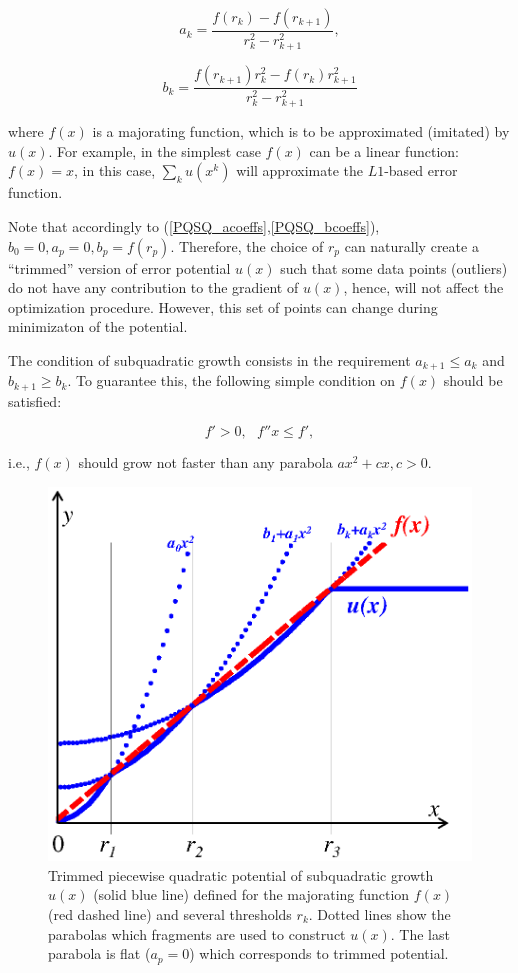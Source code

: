 \documentclass[preprint,12pt,twocolumn]{elsarticle}
\begin{document}
\begin{equation}\label{PQSQ_acoeffs}
a_k = \frac{f(r_k)-f(r_{k+1})}{r_k^2-r_{k+1}^2},
\end{equation}

\begin{equation}\label{PQSQ_bcoeffs}
b_k = \frac{f(r_{k+1})r_k^2-f(r_{k})r_{k+1}^2}{r_k^2-r_{k+1}^2}
\end{equation}

\noindent where $f(x)$ is a majorating function, which is to be approximated (imitated) by $u(x)$. For example, in the simplest case $f(x)$ can be a linear function: $f(x)=x$, in this case, $\sum_k u(x^k)$ will approximate the $L1$-based error function.

Note that accordingly to (\ref{PQSQ_acoeffs},\ref{PQSQ_bcoeffs}), $b_0=0, a_p=0, b_p=f(r_p)$. Therefore, the choice of $r_p$ can naturally create a ``trimmed'' version of error potential $u(x)$ such that some data points (outliers) do not have any contribution to the gradient of $u(x)$, hence, will not affect the optimization procedure. However, this set of points can change during minimizaton of the potential.

The condition of subquadratic growth consists in the requirement $a_{k+1}\leq a_{k}$ and $b_{k+1} \geq b_{k}$. To guarantee this, the following simple condition on $f(x)$ should be satisfied:

\begin{equation}
\label{eq:condition_function}
f'>0, \>\>\> f''x \leq f',
\end{equation}

\noindent i.e., $f(x)$ should grow not faster than any parabola $ax^2+cx, c>0$.

\begin{figure}[h]
\centering\includegraphics[width=0.9\linewidth]{potential.eps}
\caption{Trimmed piecewise quadratic potential of subquadratic growth $u(x)$ (solid blue line) defined for the majorating function $f(x)$ (red dashed line) and several thresholds $r_k$. Dotted lines show the parabolas which fragments are used to construct $u(x)$. The last parabola is flat ($a_p=0$) which corresponds to trimmed potential. \label{potential}}
\end{figure}
\end{document}
